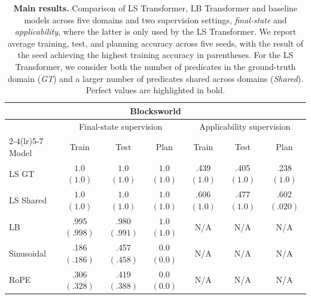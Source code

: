 \begin{table}[t]
\centering
\setlength{\tabcolsep}{4pt}
\caption{\textbf{Main results.}
Comparison of LS Transformer, LB Transformer and baseline models across five domains and two supervision settings, \textit{final-state} and \textit{applicability}, where the latter is only used by the LS Transformer. We report average training, test, and planning
accuracy across five seeds, with the result of the seed achieving the highest training accuracy in parentheses. For the LS Transformer, we consider both the number of predicates in the ground-truth domain (\textit{GT}) and a larger number of predicates shared across domains (\textit{Shared}). Perfect values are highlighted in bold.}
\label{tab:main-results}
\vspace{\baselineskip}

\begin{tabular*}{\linewidth}{@{\extracolsep{\fill}}lcccccc@{}}
\toprule
\multicolumn{7}{c}{\textbf{Blocksworld}} \\
\midrule
& \multicolumn{3}{c}{Final-state supervision} & \multicolumn{3}{c}{Applicability supervision} \\
\cmidrule(lr){2-4}\cmidrule(lr){5-7}
Model & Train & Test & Plan & Train & Test & Plan \\
\midrule
LS GT
& $\mathbf{1.0}$ $(\mathbf{1.0})$
& $\mathbf{1.0}$ $(\mathbf{1.0})$
& $\mathbf{1.0}$ $(\mathbf{1.0})$
& .439 $(\mathbf{1.0})$
& .405 $(\mathbf{1.0})$
& .238 $(\mathbf{1.0})$ \\
LS Shared
& $\mathbf{1.0}$ $(\mathbf{1.0})$
& $\mathbf{1.0}$ $(\mathbf{1.0})$
& $\mathbf{1.0}$ $(\mathbf{1.0})$
& .606 $(\mathbf{1.0})$
& .477 $(\mathbf{1.0})$
& .602 $(.020)$ \\
LB
& .995 $(.998)$
& .980 $(.991)$
& $\mathbf{1.0}$ $(\mathbf{1.0})$
& N/A
& N/A
& N/A \\
Sinusoidal
& .186 $(.186)$
& .457 $(.458)$
& 0.0 $(0.0)$
& N/A
& N/A
& N/A \\
RoPE
& .306 $(.328)$
& .419 $(.388)$
& 0.0 $(0.0)$
& N/A
& N/A
& N/A \\
\bottomrule
\end{tabular*}

\vspace{0.7em}


\end{table}
